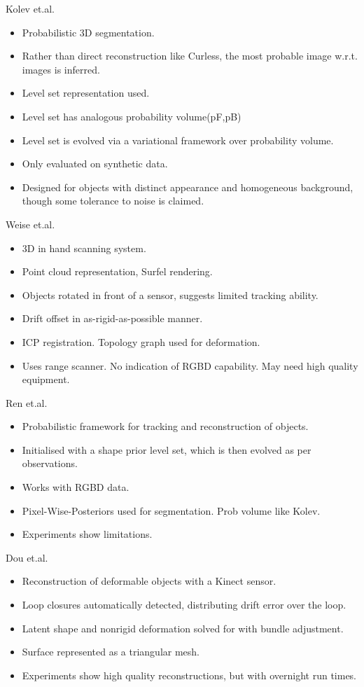 Kolev et.al. \cite{Kolev2006}
\begin{itemize}
	\item Probabilistic 3D segmentation.
	\item Rather than direct reconstruction like Curless, the most probable image w.r.t. images is inferred.
	\item Level set representation used.
	\item Level set has analogous probability volume(pF,pB)
	\item Level set is evolved via a variational framework over probability volume.
	\item Only evaluated on synthetic data.
	\item Designed for objects with distinct appearance and homogeneous background, though some tolerance to noise is claimed.
\end{itemize}

Weise et.al. \cite{Weise2009}
\begin{itemize}
	\item 3D in hand scanning system.
	\item Point cloud representation, Surfel rendering. \cite{Pfister2000}
	\item Objects rotated in front of a sensor, suggests limited tracking ability.
	\item Drift offset in as-rigid-as-possible manner. %
	\item ICP registration. Topology graph used for deformation.
	\item Uses range scanner. No indication of RGBD capability. May need high quality equipment.
\end{itemize}

Ren et.al. \cite{Ren2013}
\begin{itemize}
	\item Probabilistic framework for tracking and reconstruction of objects.
	\item Initialised with a shape prior level set, which is then evolved as per observations.
	\item Works with RGBD data.
	\item Pixel-Wise-Posteriors used for segmentation. Prob volume like Kolev. \cite{Bibby2008}
	\item Experiments show limitations.
\end{itemize}

Dou et.al. \cite{Dou2015}
\begin{itemize}
	\item Reconstruction of deformable objects with a Kinect sensor.
	\item Loop closures automatically detected, distributing drift error over the loop.
	\item Latent shape and nonrigid deformation solved for with bundle adjustment.
	\item Surface represented as a triangular mesh.
	\item Experiments show high quality reconstructions, but with overnight run times.
\end{itemize}

